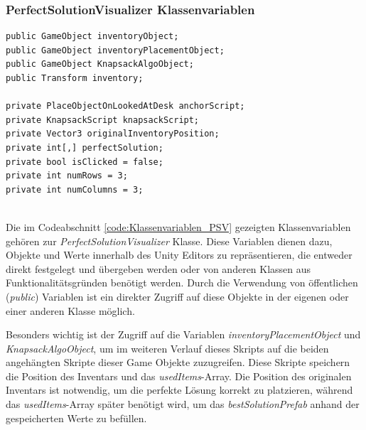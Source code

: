 \subsubsection{PerfectSolutionVisualizer Klassenvariablen}
\begin{lstlisting}[style=csharp, caption={Klassenvariablen des PerfectSolutionVisualizer}, label=code:Klassenvariablen_PSV]
public GameObject inventoryObject;
public GameObject inventoryPlacementObject;
public GameObject KnapsackAlgoObject;
public Transform inventory;

private PlaceObjectOnLookedAtDesk anchorScript;
private KnapsackScript knapsackScript;
private Vector3 originalInventoryPosition;
private int[,] perfectSolution;
private bool isClicked = false;
private int numRows = 3;
private int numColumns = 3;
\end{lstlisting}\\
Die im Codeabschnitt \ref{code:Klassenvariablen_PSV} gezeigten Klassenvariablen gehören zur \textit{PerfectSolutionVisualizer}
Klasse. Diese Variablen dienen dazu, Objekte und Werte innerhalb des Unity Editors zu repräsentieren, die entweder direkt
festgelegt und übergeben werden oder von anderen Klassen aus Funktionalitätsgründen benötigt werden. Durch die Verwendung
von öffentlichen (\textit{public}) Variablen ist ein direkter Zugriff auf diese Objekte in der eigenen oder einer anderen
Klasse möglich.

Besonders wichtig ist der Zugriff auf die Variablen \textit{inventoryPlacementObject} und \textit{KnapsackAlgoObject}, um
im weiteren Verlauf dieses Skripts auf die beiden angehängten Skripte dieser Game Objekte zuzugreifen. Diese Skripte
speichern die Position des Inventars und das \textit{usedItems}-Array. Die Position des originalen Inventars ist notwendig,
um die perfekte Lösung korrekt zu platzieren, während das \textit{usedItems}-Array später benötigt wird, um das
\textit{bestSolutionPrefab} anhand der gespeicherten Werte zu befüllen.

